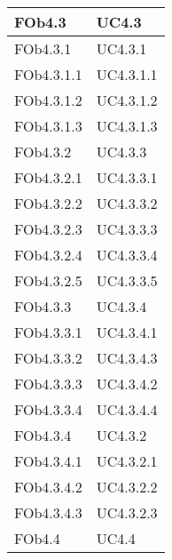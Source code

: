 \begin{longtable}{|l|p{4cm}|}
\hline
FOb4.3 & UC4.3 \linebreak  \\ 
\hline
FOb4.3.1 & UC4.3.1 \linebreak  \\ 
\hline
FOb4.3.1.1 & UC4.3.1.1 \linebreak  \\ 
\hline
FOb4.3.1.2 & UC4.3.1.2 \linebreak  \\ 
\hline
FOb4.3.1.3 & UC4.3.1.3 \linebreak  \\ 
\hline
FOb4.3.2 & UC4.3.3 \linebreak  \\ 
\hline
FOb4.3.2.1 & UC4.3.3.1 \linebreak  \\ 
\hline
FOb4.3.2.2 & UC4.3.3.2 \linebreak  \\ 
\hline
FOb4.3.2.3 & UC4.3.3.3 \linebreak  \\ 
\hline
FOb4.3.2.4 & UC4.3.3.4 \linebreak  \\ 
\hline
FOb4.3.2.5 & UC4.3.3.5 \linebreak  \\ 
\hline
FOb4.3.3 & UC4.3.4 \linebreak  \\ 
\hline
FOb4.3.3.1 & UC4.3.4.1 \linebreak  \\ 
\hline
FOb4.3.3.2 & UC4.3.4.3 \linebreak  \\ 
\hline
FOb4.3.3.3 & UC4.3.4.2 \linebreak  \\ 
\hline
FOb4.3.3.4 & UC4.3.4.4 \linebreak  \\ 
\hline
FOb4.3.4 & UC4.3.2 \linebreak  \\ 
\hline
FOb4.3.4.1 & UC4.3.2.1 \linebreak  \\ 
\hline
FOb4.3.4.2 & UC4.3.2.2 \linebreak  \\ 
\hline
FOb4.3.4.3 & UC4.3.2.3 \linebreak  \\ 
\hline
FOb4.4 & UC4.4 \linebreak  \\ 

\end{longtable}
